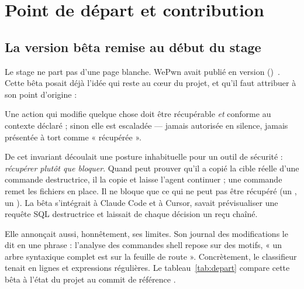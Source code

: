 \section{Point de départ et contribution}
\label{sec:depart}

\subsection{La version bêta remise au début du stage}
Le stage ne part pas d'une page blanche. WePwn avait publié \demo{} en version
\betaversion{} (\betadate{})~\cite{demo-cli-beta}. Cette bêta posait déjà l'idée qui
reste au c\oe ur du projet, et qu'il faut attribuer à son point d'origine :

\begin{encadre}
Une action qui modifie quelque chose doit être récupérable \emph{et} conforme au contexte
déclaré ; sinon elle est escaladée --- jamais autorisée en silence, jamais présentée à
tort comme « récupérée ».
\end{encadre}

De cet invariant découlait une posture inhabituelle pour un outil de sécurité :
\emph{récupérer plutôt que bloquer}. Quand \demo{} peut prouver qu'il a copié la cible
réelle d'une commande destructrice, il la copie et laisse l'agent continuer ; une
commande  remet les fichiers en place. Il ne bloque que ce qui
ne peut pas être récupéré (un , un ). La bêta
s'intégrait à Claude Code et à Cursor, savait prévisualiser une requête SQL destructrice
et laissait de chaque décision un reçu chaîné.

Elle annonçait aussi, honnêtement, ses limites. Son journal des modifications le dit en
une phrase : l'analyse des commandes shell repose sur des motifs, « un arbre syntaxique
complet est sur la feuille de route ». Concrètement, le classifieur tenait en
\betaclassify{} lignes et \betaregex{} expressions régulières. Le tableau~\ref{tab:depart}
compare cette bêta à l'état du projet au commit de référence \commitref{}.


